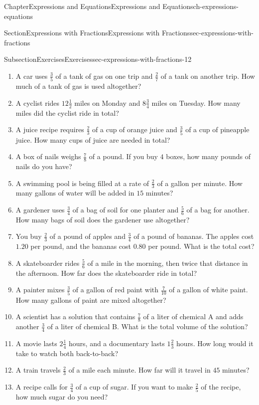 \documentclass[twoside,11pt,]{book}
\numberwithin{equation}{chapter}
\begin{document}
\begin{chapterptx}{Chapter}{Expressions and Equations}{}{Expressions and Equations}{}{}{ch-expressions-equations}
\begin{sectionptx}{Section}{Expressions with Fractions}{}{Expressions with Fractions}{}{}{sec-expressions-with-fractions}
\begin{subsectionptx}{Subsection}{Exercises}{}{Exercises}{}{}{sec-expressions-with-fractions-12}
\begin{enumerate}
\item{}A car uses \(\frac{3}{5}\) of a tank of gas on one trip and \(\frac{2}{7}\) of a tank on another trip. How much of a tank of gas is used altogether?%
\item{}A cyclist rides \(12\frac{1}{2}\) miles on Monday and \(8\frac{3}{4}\) miles on Tuesday. How many miles did the cyclist ride in total?%
\item{}A juice recipe requires \(\frac{2}{3}\) of a cup of orange juice and \(\frac{3}{5}\) of a cup of pineapple juice. How many cups of juice are needed in total?%
\item{}A box of nails weighs \(\frac{7}{8}\) of a pound. If you buy \(4\) boxes, how many pounds of nails do you have?%
\item{}A swimming pool is being filled at a rate of \(\frac{2}{3}\) of a gallon per minute. How many gallons of water will be added in \(15\) minutes?%
\item{}A gardener uses \(\frac{3}{4}\) of a bag of soil for one planter and \(\frac{5}{6}\) of a bag for another. How many bags of soil does the gardener use altogether?%
\item{}You buy \(\frac{2}{3}\) of a pound of apples and \(\frac{3}{4}\) of a pound of bananas. The apples cost \textdollar{}\(1.20\) per pound, and the bananas cost \textdollar{}\(0.80\) per pound. What is the total cost?%
\item{}A skateboarder rides \(\frac{5}{6}\) of a mile in the morning, then twice that distance in the afternoon. How far does the skateboarder ride in total?%
\item{}A painter mixes \(\frac{3}{5}\) of a gallon of red paint with \(\frac{7}{10}\) of a gallon of white paint. How many gallons of paint are mixed altogether?%
\item{}A scientist has a solution that contains \(\frac{7}{8}\) of a liter of chemical A and adds another \(\frac{3}{4}\) of a liter of chemical B. What is the total volume of the solution?%
\item{}A movie lasts \(2\frac{1}{4}\) hours, and a documentary lasts \(1\frac{2}{3}\) hours. How long would it take to watch both back-to-back?%
\item{}A train travels \(\frac{2}{3}\) of a mile each minute. How far will it travel in \(45\) minutes?%
\item{}A recipe calls for \(\frac{3}{4}\) of a cup of sugar. If you want to make \(\frac{2}{5}\) of the recipe, how much sugar do you need?%
\end{enumerate}

\end{subsectionptx}
\end{sectionptx}
\end{chapterptx}
\end{document}
